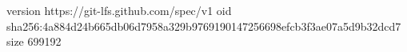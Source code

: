 version https://git-lfs.github.com/spec/v1
oid sha256:4a884d24b665db06d7958a329b9769190147256698efcb3f3ae07a5d9b32dcd7
size 699192
